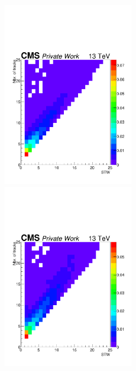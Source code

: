 \documentclass{cernatlasnote}
\begin{document}
\begin{figure}[ht]
\includegraphics[height=8cm, width=9cm, trim= 0cm 0cm 0cm 0cm,clip]{images/VTXBDT/STW_Ntrks_400_300_100.pdf}\includegraphics[height=8cm, width=9cm, trim= 0cm 0cm 0cm 0cm,clip]{images/VTXBDT/STW_Ntrks_500_350_100.pdf}

\end{figure}
\end{document}
